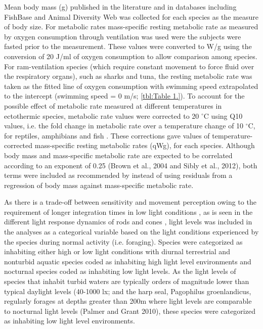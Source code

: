Mean body mass (g) published in the literature and in databases including FishBase \citep{froese2012fishbase} and Animal Diversity Web \citep{myers2006animal} was collected for each species as the measure of body size. For metabolic rates mass-specific resting metabolic rate as measured by oxygen consumption through ventilation  was used were the subjects were fasted prior to the measurement. These values were converted to W/g using the conversion of 20 J/ml of oxygen consumption \citep{makarieva2008mean} to allow comparison among species. For ram-ventilation species (which require constant movement to force fluid over the respiratory organs), such as sharks and tuna, the resting metabolic rate was taken as the fitted line of oxygen consumption with swimming speed extrapolated to the intercept (swimming speed = 0 m/s; \ref{tbl:Table 1.}). To account for the possible effect of metabolic rate measured at different temperatures in ectothermic species, metabolic rate values were corrected to 20 $^{\circ}$C using Q10 values, i.e. the fold change in metabolic rate over a temperature change of 10 $^{\circ}$C, for reptiles, amphibians and fish \citep{white2006scaling}. These corrections gave values of temperature-corrected mass-specific resting metabolic rates (qWg), for each species. Although body mass and mass-specific metabolic rate are expected to be correlated according to an exponent of 0.25 \citep{brown2004, sibly2012metabolic} (Brown et al., 2004 and Sibly et al., 2012), both terms were included as recommended by \citep{freckleton2009seven} instead of using residuals from a regression of body mass against mass-specific metabolic rate.

As there is a trade-off between sensitivity and movement perception owing to the requirement of longer integration times in low light conditions \citep{tansley1965vision}, as is seen in the different light response dynamics of rods and cones \citep{rubene2010presence}, light levels was included in the analyses as a categorical variable based on the light conditions experienced by the species during normal activity (i.e. foraging). Species were categorized as inhabiting either high or low light conditions with diurnal terrestrial and nonturbid aquatic species coded as inhabiting high light level environments and nocturnal species coded as inhabiting low light levels. As the light levels of species that inhabit turbid waters are typically orders of magnitude lower than typical daylight levels (40-1000 lx; \citealt{ali1985vision,palmer2010art,kreysing2012photonic} and the harp seal, Pagophilus groenlandicus, regularly forages at depths greater than 200m \citep{folkow2004distribution} where light levels are comparable to nocturnal light levels (Palmer and Grant 2010), these species were categorized as inhabiting low light level environments.


